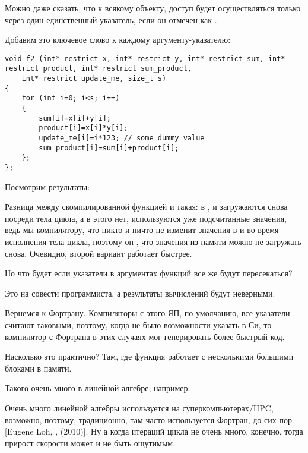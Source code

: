 Можно даже сказать, что к всякому объекту, доступ будет осуществляться только через
один единственный указатель, если он отмечен как .

Добавим это ключевое слово к каждому аргументу-указателю:

\begin{lstlisting}
void f2 (int* restrict x, int* restrict y, int* restrict sum, int* restrict product, int* restrict sum_product, 
	int* restrict update_me, size_t s)
{
	for (int i=0; i<s; i++)
	{
		sum[i]=x[i]+y[i];
		product[i]=x[i]*y[i];
		update_me[i]=i*123; // some dummy value
		sum_product[i]=sum[i]+product[i];	
	};
};
\end{lstlisting}

Посмотрим результаты:





Разница между скомпилированной функцией  и  такая:
в ,  и  загружаются снова посреди тела цикла,
а в  этого нет, используются уже подсчитанные значения, 
ведь мы  компилятору, 
что никто и ничто не изменит значения в  
и  во время исполнения тела цикла, 
поэтому он , что значения из памяти можно не загружать снова.
Очевидно, второй вариант работает быстрее.

Но что будет если указатели в аргументах функций все же будут пересекаться?

Это на совести программиста, а результаты вычислений будут неверными.

Вернемся к Фортрану. 
Компиляторы с этого ЯП, по умолчанию, все указатели считают таковыми,
поэтому, когда не было возможности указать  в Си, 
то компилятор с Фортрана в этих случаях мог генерировать более быстрый код.

Насколько это практично? 
Там, где функция работает с несколькими большими блоками в памяти.

Такого очень много в линейной алгебре, например.

Очень много линейной алгебры используется на суперкомпьютерах/\ac{HPC},
возможно, поэтому, традиционно, там часто используется Фортран, до сих пор
[Eugene Loh, , (2010)].
Ну а когда итераций цикла не очень много, конечно, 
тогда прирост скорости может и не быть ощутимым.

